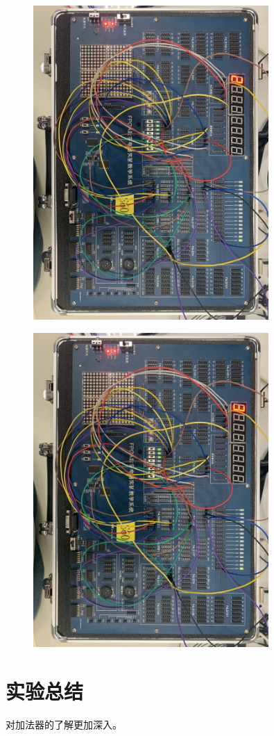 \documentclass[UTF8, a4paper, 11pt]{article}
\begin{document}
\begin{figure}[H]
    \centering
    \includegraphics[width=0.8\textwidth]{箱110.png}
\end{figure}
\begin{figure}[H]
    \centering
    \includegraphics[width=0.8\textwidth]{箱111.png}
\end{figure}
\section{实验总结}
对加法器的了解更加深入。
%
%
\end{document}
